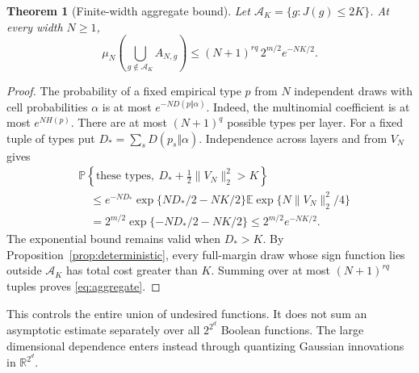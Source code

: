 \documentclass[11pt]{article}
\newtheorem{theorem}{Theorem}[section]\newtheorem{proposition}[theorem]{Proposition}
\theoremstyle{remark}\newtheorem{remark}[theorem]{Remark}
\newcommand{\E}{\mathbb E}\newcommand{\Prb}{\mathbb P}\newcommand{\R}{\mathbb R}
\begin{document}
\begin{theorem}[Finite-width aggregate bound]\label{thm:aggregate}
Let $\mathcal A_K=\{g:J(g)\leq2K\}$. At every width $N\geq1$,
\begin{equation}\label{eq:aggregate}
 \mu_N\left(\bigcup_{g\notin\mathcal A_K}A_{N,g}\right)
 \leq (N+1)^{rq}\,2^{m/2}e^{-NK/2}.
\end{equation}
\end{theorem}
\begin{proof}
The probability of a fixed empirical type $p$ from $N$ independent draws
with cell probabilities $\alpha$ is at most $e^{-ND(p\Vert\alpha)}$.
Indeed, the multinomial coefficient is at most $e^{NH(p)}$.
There are at most $(N+1)^q$ possible types per layer.
For a fixed tuple of types put $D_* =\sum_sD(p_s\Vert\alpha)$.
Independence across layers and from $V_N$ gives
\begin{align*}
 &\Prb\!\left\{\text{these types},\ D_*+\tfrac12\|V_N\|_2^2>K\right\}\\
 &\quad\leq e^{-ND_*}
       \exp\{ND_*/2-NK/2\}
       \E\exp\{N\|V_N\|_2^2/4\}\\
 &\quad=2^{m/2}\exp\{-ND_*/2-NK/2\}
 \leq2^{m/2}e^{-NK/2}.
\end{align*}
The exponential bound remains valid when $D_*>K$.
By Proposition~\ref{prop:deterministic}, every full-margin draw whose sign
function lies outside $\mathcal A_K$ has total cost greater than $K$.
Summing over at most $(N+1)^{rq}$ tuples proves \eqref{eq:aggregate}.
\end{proof}

This controls the entire union of undesired functions. It does not sum an
asymptotic estimate separately over all $2^{2^d}$ Boolean functions. The
large dimensional dependence enters instead through quantizing Gaussian
innovations in $\R^{2^d}$.
\end{document}
